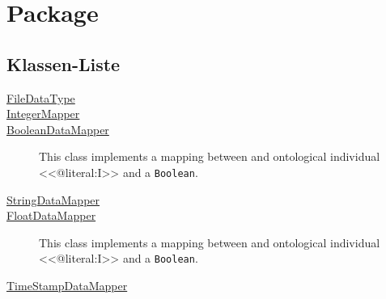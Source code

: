 
\chapter[Package ontologyFramework.OFDataMapping.primitiveDataMapper]{Package }\label{ontologyFramework.OFDataMapping.primitiveDataMapper-package}



\section{Klassen-Liste}
\begin{description}
\item[{\hyperlink{ontologyFramework.OFDataMapping.primitiveDataMapper.FileDataType-class}{FileDataType}}]

\hfill\pageref{ontologyFramework.OFDataMapping.primitiveDataMapper.FileDataType-class}

\item[{\hyperlink{ontologyFramework.OFDataMapping.primitiveDataMapper.IntegerMapper-class}{IntegerMapper}}]

\hfill\pageref{ontologyFramework.OFDataMapping.primitiveDataMapper.IntegerMapper-class}

\item[{\hyperlink{ontologyFramework.OFDataMapping.primitiveDataMapper.BooleanDataMapper-class}{BooleanDataMapper}}]
This class implements a mapping between and 
 ontological individual <<@literal:I>> and a \texttt{Boolean}.
\hfill\pageref{ontologyFramework.OFDataMapping.primitiveDataMapper.BooleanDataMapper-class}

\item[{\hyperlink{ontologyFramework.OFDataMapping.primitiveDataMapper.StringDataMapper-class}{StringDataMapper}}]

\hfill\pageref{ontologyFramework.OFDataMapping.primitiveDataMapper.StringDataMapper-class}

\item[{\hyperlink{ontologyFramework.OFDataMapping.primitiveDataMapper.FloatDataMapper-class}{FloatDataMapper}}]
This class implements a mapping between and 
 ontological individual <<@literal:I>> and a \texttt{Boolean}.
\hfill\pageref{ontologyFramework.OFDataMapping.primitiveDataMapper.FloatDataMapper-class}

\item[{\hyperlink{ontologyFramework.OFDataMapping.primitiveDataMapper.TimeStampDataMapper-class}{TimeStampDataMapper}}]

\hfill\pageref{ontologyFramework.OFDataMapping.primitiveDataMapper.TimeStampDataMapper-class}

\end{description}
